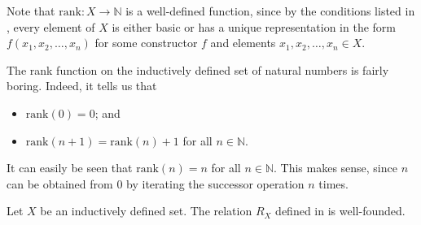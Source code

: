 Note that $\mathrm{rank} : X \to \mathbb{N}$ is a well-defined function, since by the conditions listed in , every element of $X$ is either basic or has a unique representation in the form $f(x_1,x_2,\dots,x_n)$ for some constructor $f$ and elements $x_1,x_2,\dots,x_n \in X$.

\begin{example}
\label{exRankOnN}
The rank function on the inductively defined set of natural numbers is fairly boring. Indeed, it tells us that
\begin{itemize}
\item $\mathrm{rank}(0)=0$; and
\item $\mathrm{rank}(n+1) = \mathrm{rank}(n) + 1$ for all $n \in \mathbb{N}$.
\end{itemize}
It can easily be seen that $\mathrm{rank}(n)=n$ for all $n \in \mathbb{N}$. This makes sense, since $n$ can be obtained from $0$ by iterating the successor operation $n$ times.
\end{example}

\begin{lemma}
Let $X$ be an inductively defined set. The relation $R_X$ defined in  is well-founded.
\end{lemma}
\begin{cproof}

\end{cproof}

\begin{cproof}
\label{prfStructuralInduction}
\end{cproof}


